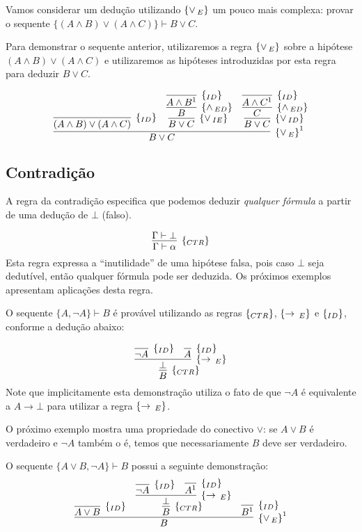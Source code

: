 \begin{Example}
Vamos considerar um dedução utilizando $\scriptsize{\{\lor\,_{E}\}}$ um pouco mais complexa:
provar o sequente $\{(A \land B) \lor (A \land C)\}\vdash B \lor C$.

Para demonstrar o sequente anterior, utilizaremos a regra $\scriptsize{\{\lor\,_{E}\}}$ sobre
a hipótese $(A \land B)\lor (A \land C)$ e utilizaremos as hipóteses
introduzidas por esta regra para deduzir $B\lor C$.

\[
\infer[\orE^1]{B \lor C}
        {
          \infer[\Id]{(A \land B)\lor (A\land C)}{} &
          \infer[\orIE]{B \lor C}
                  {
                     \infer[\andED]{B}
                             {
                               \infer[\Id]{A\land B^1}{}
                             }
                  } &
          \infer[\orID]{B \lor C}
                  {
                     \infer[\andED]{C}
                             {
                               \infer[\Id]{A\land C^1}{}
                             }
                  }
        }
\]

\end{Example}

\subsection{Contradição}

A regra da contradição especifica que podemos deduzir \emph{qualquer
  fórmula} a partir de uma dedução de $\bot$ (falso).

\[
\infer[\ctr]{\Gamma \vdash \alpha}
                 {\Gamma \vdash \bot}
\]
Esta regra expressa a ``inutilidade'' de uma hipótese falsa, pois caso
$\bot$ seja dedutível, então qualquer fórmula pode ser deduzida. Os
próximos exemplos apresentam aplicações desta regra.

\begin{Example}
O sequente $\{A, \neg A \}\vdash B$ é provável utilizando as regras
$\scriptsize{\{_{CTR}\}}$, $\scriptsize{\{\to\,_E\}}$ e $\scriptsize{\{_{ID}\}}$, conforme a dedução abaixo:

\[
\infer[\ctr]{B}
        {
           \infer[\impE]{\bot}
                    {
                         \infer[\Id]{\neg A}{} &
                         \infer[\Id]{A}{}
                    }
        }
\]
Note que implicitamente esta demonstração utiliza o fato de que $\neg
A$ é equivalente a $A \to \bot$ para utilizar a regra $\scriptsize{\{\to\,_E\}}$.
\end{Example}
O próximo exemplo mostra uma propriedade do conectivo $\lor$: se
$A\lor B$ é verdadeiro e $\neg A$ também o é, temos que
necessariamente $B$ deve ser verdadeiro.
\begin{Example}
O sequente $\{A \lor B,\neg A\}\vdash B$ possui a seguinte
demonstração:
\[
\infer[\orE^1]{B}
         {
           \infer[\Id]{A\lor B}{} &
           \infer[\ctr]{B}
                  {
                    \infer[\impE]{\bot}
                            {
                              \infer[\Id]{\neg A}{} &
                              \infer[\Id]{A^1}{}
                            }
                  } &
           \infer[\Id]{B^1}{}
         }
\]
\end{Example}

